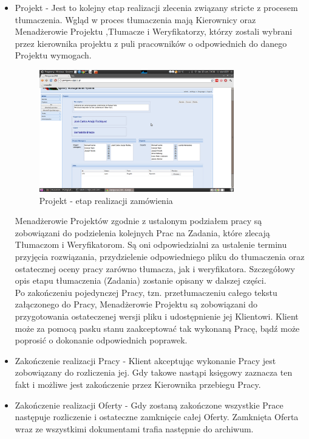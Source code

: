 \documentclass[licencjacka]{pracamgr}
\begin{document}
\begin{itemize}
\item Projekt - Jest to kolejny etap realizacji zlecenia związany stricte z procesem tłumaczenia. Wgląd w proces tłumaczenia mają Kierownicy oraz Menadżerowie Projektu ,Tłumacze i Weryfikatorzy, którzy zostali wybrani przez kierownika projektu z puli pracowników o odpowiednich do danego Projektu wymogach.\\
\begin{figure}[ht!]
\centering
\includegraphics[width=0.8\textwidth]{resources/project.png}
\caption{Projekt - etap realizacji zamówienia}
\end{figure}
 
Menadżerowie Projektów zgodnie z ustalonym podziałem pracy są zobowiązani do podzielenia kolejnych Prac na Zadania, które zlecają Tłumaczom i Weryfikatorom. Są oni odpowiedzialni za ustalenie terminu przyjęcia rozwiązania, przydzielenie odpowiedniego pliku do tłumaczenia oraz ostatecznej oceny pracy zarówno tłumacza, jak i weryfikatora. Szczegółowy opis etapu tłumaczenia (Zadania) zostanie opisany w dalszej części.\\
Po zakończeniu pojedynczej Pracy, tzn. przetłumaczeniu całego tekstu załączonego do Pracy, Menadżerowie Projektu są zobowiązani do przygotowania ostateczenej wersji pliku i udostępnienie jej Klientowi. Klient może za pomocą pasku stanu zaakceptować tak wykonaną Pracę, bądź może poprosić o dokonanie odpowiednich poprawek.

\item Zakończenie  realizacji Pracy - Klient akceptując wykonanie Pracy jest zobowiązany do rozliczenia jej. Gdy takowe nastąpi księgowy zaznacza ten fakt i możliwe jest zakończenie przez Kierownika przebiegu Pracy. 
\item Zakończenie  realizacji Oferty - Gdy zostaną zakończone wszystkie Prace następuje rozliczenie i ostateczne zamknięcie całej Oferty. Zamknięta Oferta wraz ze wszystkimi dokumentami trafia następnie do archiwum. 
\end{itemize}  
\end{document}
